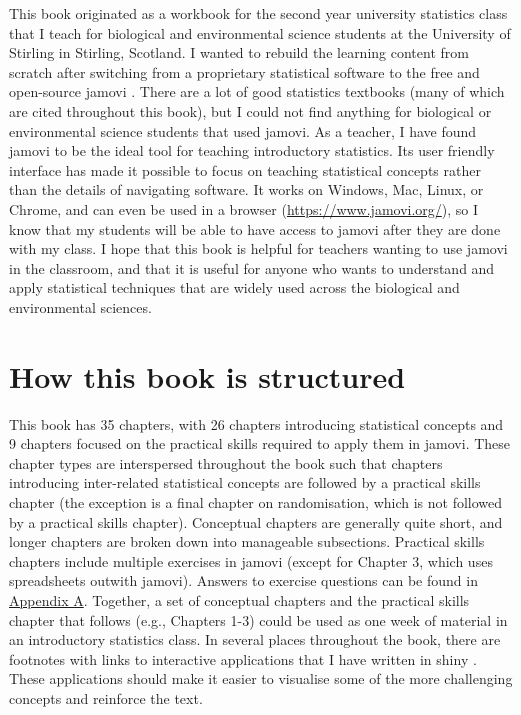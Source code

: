 \documentclass[
  openany]{krantz}
\begin{document}
This book originated as a workbook for the second year university statistics class that I teach for biological and environmental science students at the University of Stirling in Stirling, Scotland.
I wanted to rebuild the learning content from scratch after switching from a proprietary statistical software to the free and open-source jamovi \citep{Jamovi2022}.
There are a lot of good statistics textbooks (many of which are cited throughout this book), but I could not find anything for biological or environmental science students that used jamovi.
As a teacher, I have found jamovi to be the ideal tool for teaching introductory statistics.
Its user friendly interface has made it possible to focus on teaching statistical concepts rather than the details of navigating software.
It works on Windows, Mac, Linux, or Chrome, and can even be used in a browser (\url{https://www.jamovi.org/}), so I know that my students will be able to have access to jamovi after they are done with my class.
I hope that this book is helpful for teachers wanting to use jamovi in the classroom, and that it is useful for anyone who wants to understand and apply statistical techniques that are widely used across the biological and environmental sciences.

\hypertarget{structure}{%
\section*{How this book is structured}\label{structure}}


This book has 35 chapters, with 26 chapters introducing statistical concepts and 9 chapters focused on the practical skills required to apply them in jamovi.
These chapter types are interspersed throughout the book such that chapters introducing inter-related statistical concepts are followed by a practical skills chapter (the exception is a final chapter on randomisation, which is not followed by a practical skills chapter).
Conceptual chapters are generally quite short, and longer chapters are broken down into manageable subsections.
Practical skills chapters include multiple exercises in jamovi (except for Chapter 3, which uses spreadsheets outwith jamovi).
Answers to exercise questions can be found in \protect\hyperlink{appendexA}{Appendix A}.
Together, a set of conceptual chapters and the practical skills chapter that follows (e.g., Chapters 1-3) could be used as one week of material in an introductory statistics class.
In several places throughout the book, there are footnotes with links to interactive applications that I have written in shiny \citep{Rshiny, Wickham2021}.
These applications should make it easier to visualise some of the more challenging concepts and reinforce the text.
\end{document}

